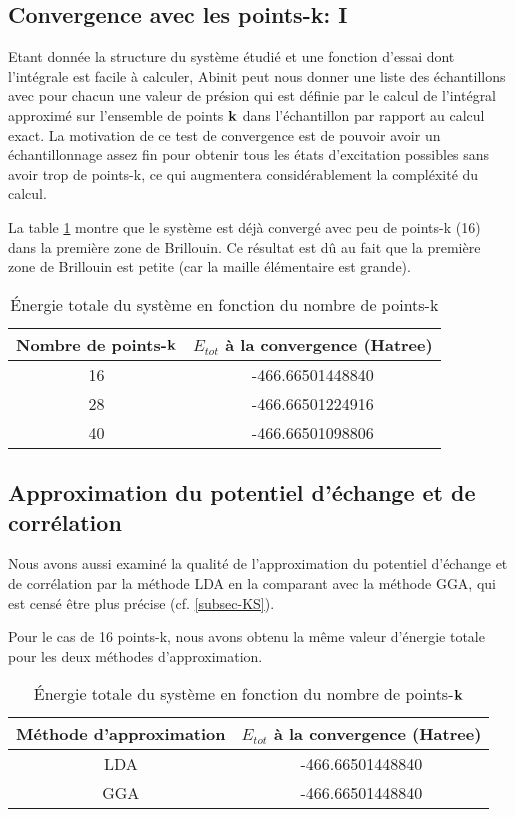 \subsection{Convergence avec les points-k: I}
Etant donnée la structure du système étudié et une fonction d'essai dont l'intégrale est facile à calculer,
Abinit peut nous donner une liste des échantillons avec pour chacun une valeur de présion
qui est définie par le calcul de l'intégral approximé sur l'ensemble de points $\vb{k}$ dans l'échantillon
par rapport au calcul exact.
La motivation de ce test de convergence est de pouvoir avoir un échantillonnage
assez fin pour obtenir tous les états d'excitation possibles sans avoir trop de points-k,
ce qui augmentera considérablement la compléxité du calcul.

La table \cref{tab-etotPK} montre que le système est déjà convergé avec peu de points-k (16) dans la première zone de Brillouin.
Ce résultat est dû au fait que la première zone de Brillouin est petite (car la maille élémentaire est grande).
\begin{table}[ht]\label{tab-etotPK}
\caption{Énergie totale du système en fonction du nombre de points-k}
\centering
\begin{tabular}{c c}
\toprule
Nombre de points-$\vb{k}$  &  $E_{tot}$ à la convergence (Hatree)
\\
\midrule
16    &  -466.66501448840
\\
28    &  -466.66501224916
\\
40    &  -466.66501098806
\bottomrule
\end{tabular}
\end{table}

\subsection{Approximation du potentiel d'échange et de corrélation}
Nous avons aussi examiné la qualité de l'approximation du potentiel d'échange et de corrélation
par la méthode LDA en la comparant avec la méthode GGA,
qui est censé être plus précise (cf. \cref{subsec-KS}).

Pour le cas de 16 points-k, nous avons obtenu la même valeur d'énergie totale pour les deux méthodes d'approximation.

\begin{table}[ht]\label{etotPK}
\caption{Énergie totale du système en fonction du nombre de points-$\vb{k}$}
\centering
\begin{tabular}{c c}
\toprule
Méthode d'approximation &  $E_{tot}$ à la convergence (Hatree)
\\
\midrule
LDA    &  -466.66501448840
\\
GGA   &   -466.66501448840
\bottomrule
\end{tabular}
\end{table}

